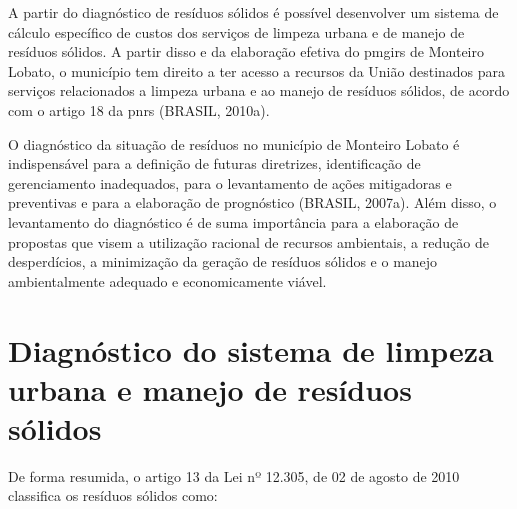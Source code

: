	A partir do diagnóstico de resíduos sólidos é possível desenvolver um sistema de cálculo específico de custos dos serviços de limpeza urbana e de manejo de resíduos sólidos. A partir disso e da elaboração efetiva do \gls{pmgirs} de Monteiro Lobato, o município tem direito a ter acesso a recursos da União destinados para serviços relacionados a limpeza urbana e ao manejo de resíduos sólidos, de acordo com o artigo 18 da \gls{pnrs} (BRASIL, 2010a).
	
	O diagnóstico da situação de resíduos no município de Monteiro Lobato é indispensável para a definição de futuras diretrizes, identificação de gerenciamento inadequados, para o levantamento de ações mitigadoras e preventivas e para a elaboração de prognóstico (BRASIL, 2007a). Além disso, o levantamento do diagnóstico é de suma importância para a elaboração de propostas que visem a utilização racional de recursos ambientais, a redução de desperdícios, a minimização da geração de resíduos sólidos e o manejo ambientalmente adequado e economicamente viável.
	
	\section{Diagnóstico do sistema de limpeza urbana e manejo de resíduos sólidos}
	
	De forma resumida, o artigo 13 da Lei nº 12.305, de 02 de agosto de 2010 classifica os resíduos sólidos como:
	
